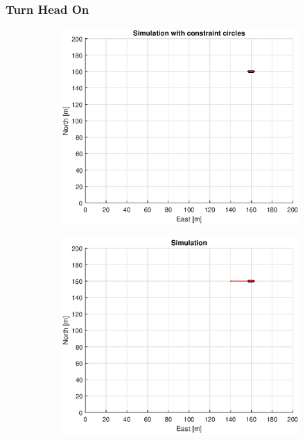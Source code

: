 \subsubsection{Turn Head On}
\begin{figure}[!b]
    \begin{subfigure}[b]{0.49\textwidth}
        \centering
        \includegraphics[width=\textwidth]{Images/Figures/sving_HO/Simple0_f1_Frame1}
    \end{subfigure}
    \hfill
    \begin{subfigure}[b]{0.499\textwidth}
        \centering
        \includegraphics[width=\textwidth]{Images/Figures/sving_HO/Simple0_f600_Frame1}

\end{subfigure}
\end{figure}

